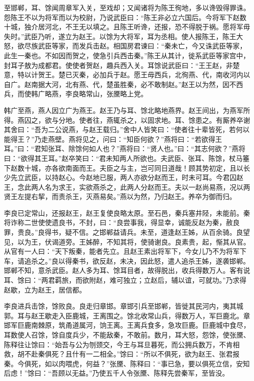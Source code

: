 \documentclass[]{article}
\begin{document}
至邯郸，耳、馀闻周章军入关，至戏却；又闻诸将为陈王徇地，多以谗毁得罪诛。怨陈王不以为将军而以为校尉，乃说武臣曰：``陈王非必立六国后。今将军下赵数十城，独介居河北，不王无以填之。且陈王听谗，还报，恐不得脱于祸。愿将军毋失时。''武臣乃听，遂立为赵王。以馀为大将军，耳为丞相。使人报陈王，陈王大怒，欲尽族武臣等家，而发兵击赵。相国房君谏曰：``秦未亡，今又诛武臣等家，此生一秦也。不如因而贺之，使急引兵西击秦。''陈王从其计，徙系武臣等家宫中，封耳子敖为成都君。使使者贺赵，趣兵西入关。耳馀说武臣曰：``王王赵，非楚意，特以计贺王。楚已灭秦，必加兵于赵。愿王毋西兵，北徇燕、代，南收河内以自广。赵南据大河，北有燕、代，楚虽胜秦，必不敢制赵。''赵王以为然，因不西兵，而使韩广略燕，李良略常山，张黡略上党。

韩广至燕，燕人因立广为燕王。赵王乃与耳、馀北略地燕界。赵王间出，为燕军所得。燕囚之，欲与分地。使者往，燕辄杀之，以固求地。耳、馀患之。有厮养卒谢其舍曰：``吾为二公说燕，与赵王载归。''舍中人皆笑曰：``使者往十辈皆死，若何以能得王？''乃走燕壁。燕将见之，问曰：``知臣何欲？''燕将曰：``若欲得王耳。''曰：``君知张耳、除馀何如人也？''燕将曰：``贤人也。''曰：``其志何欲？''燕将曰：``欲得其王耳。''赵卒笑曰：``君未知两人所欲也。夫武臣、张耳、陈馀，杖马箠下赵数十城，亦各欲南面而王。夫臣之与主，岂可同日道哉！顾其势初定，且以长少先立武臣，以持赵心。今赵地已服，两人亦欲分赵而王，时未可耳。今君囚赵王，念此两人名为求王，实欲燕杀之，此两人分赵而王。夫以一赵尚易燕，况以两贤王左提右挈，而责杀王，灭燕易矣。''燕以为然，乃归赵王。养卒为御而归。

李良已定常山，还报赵王，赵王复使良略太原。至石邑，秦兵塞井陉，未能前。秦将诈称二世使使遗良书，不封，曰：``良尝事我，得显幸，诚能反赵为秦，赦良罪，贵良。''良得书，疑不信。之邯郸益请兵。未至，道逢赵王姊，从百余骑。良望见，以为王，伏谒道旁。王姊醉，不知其将，使骑谢良。良素贵，起，惭其从官。从官有一人曰：``天下叛秦，能者先立。且赵王素出将军下，今女儿乃不为将军下车，请追杀之。''良以得秦书，欲反赵，未决，因此怒，遣人追杀王姊，遂袭邯郸。邯郸不知，意杀武臣。赵人多为耳、馀耳目者，故得脱出，收兵得数万人。客有说耳、馀曰：``两君羁旅，而欲附赵，难可独立；立赵后，辅以谊，可就功。''乃求得赵歇，立为赵王，居信都。

李良进兵击馀，馀败良。良走归章邯。章邯引兵至邯郸，皆徙其民河内，夷其城郭。耳与赵王歇走入臣鹿城，王离围之。馀北收常山兵，得数万人，军巨鹿北。章邯军巨鹿南棘原，筑甬道属河，饷王离。王离兵食多，急攻巨鹿。巨鹿城中食尽，耳数使人召馀，馀自度兵少，不能敌秦，不敢前。数月，耳大怒，怨馀，使张黡、陈释往让馀曰：``始吾与公为刎颈交，今王与耳旦暮死，而公拥兵数万，不肯相救，胡不赴秦俱死？且什有一二相全。''馀曰：``所以不俱死，欲为赵王、张君报秦。今俱死，如以肉喂虎，何益？''张黡、陈释曰：``事已急，要以俱死立信，安知后虑！''馀曰：``吾顾以无益。''乃使五千人令张黡、陈释先尝秦军，至皆没。
\end{document}
